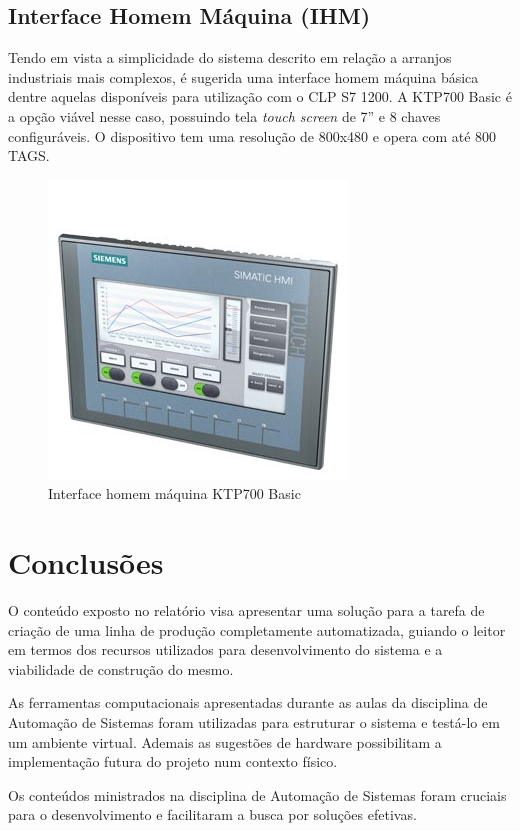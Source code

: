 \documentclass[
	12pt,				%
	openright,			%
	oneside,			%
	a4paper,			%
	english,			%
	brazil,				%
	]{abntex2}
\begin{document}
\section{Interface Homem Máquina (IHM)}

Tendo em vista a simplicidade do sistema descrito em relação a arranjos industriais mais complexos, é sugerida uma interface homem máquina básica dentre aquelas disponíveis para utilização com o CLP S7 1200. A KTP700 Basic é a opção viável nesse caso, possuindo tela \textit{touch screen} de 7'' e 8 chaves configuráveis. O dispositivo tem uma resolução de 800x480 e opera com até 800 TAGS.

\begin{figure}[H]
\centering
\includegraphics[width=0.5\linewidth]{Imagens/i10.jpg}
\caption{Interface homem máquina KTP700 Basic}
\label{fig:ihm_sugerida}
\end{figure}

\chapter{Conclusões}

O conteúdo exposto no relatório visa apresentar uma solução para a tarefa de criação de uma linha de produção completamente automatizada, guiando o leitor em termos dos recursos utilizados para desenvolvimento do sistema e a viabilidade de construção do mesmo. 

As ferramentas computacionais apresentadas durante as aulas da disciplina de Automação de Sistemas foram utilizadas para estruturar o sistema e testá-lo em um ambiente virtual. Ademais as sugestões de hardware possibilitam a implementação futura do projeto num contexto físico.

Os conteúdos ministrados na disciplina de Automação de Sistemas foram cruciais para o desenvolvimento e facilitaram a busca por soluções efetivas. 
\end{document}
